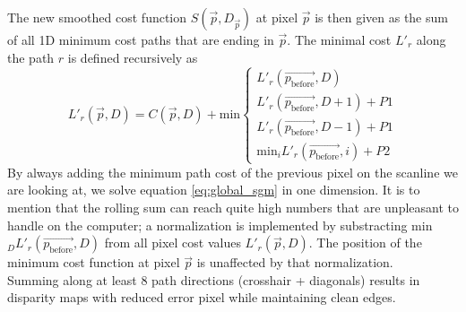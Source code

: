 \documentclass  [
  paper    = a4,
  BCOR     = 10mm,
  twoside,
  fontsize = 12pt,
  fleqn,
  toc      = bibnumbered,
  toc      = listofnumbered,
  numbers  = noendperiod,
  headings = normal,
  listof   = leveldown,
  version  = 3.03
]                                       {scrreprt}
\begin{document}
The new smoothed cost function $S(\vec p , D_{\vec p})$ at pixel $\vec{p}$ is then given as the sum of all 1D minimum cost paths that are ending in $\vec{p}$.  The minimal cost $L'_r$ along the path $r$ is defined recursively as
\begin{equation}\label{eq:local_sgm}
L'_r(\vec{p}, D) = C(\vec{p}, D) + \text {min}
\begin{cases}
	L'_r(\vec{p_\text{before}}, D) \\
	L'_r(\vec{p_\text{before}}, D+1)+P1 \\
	L'_r(\vec{p_\text{before}}, D-1)+P1 \\
	\text{min}_i L'_r(\vec{p_\text{before}}, i)+P2 
\end{cases}
\end{equation} 
By always adding the minimum path cost of the previous pixel on the scanline we are looking at, we solve equation \ref{eq:global_sgm} in one dimension. It is to mention that the rolling sum can reach quite high numbers that are unpleasant to handle on the computer; a normalization is implemented by substracting min$_D L'_r(\vec{p_\text{before}}, D)$ from all pixel cost values $L'_r(\vec{p}, D)$. The position of the minimum cost function at pixel $\vec p$ is unaffected by that normalization.\\
 Summing along at least 8 path directions (crosshair + diagonals) results in disparity maps with reduced error pixel while maintaining clean edges. 
\end{document}
